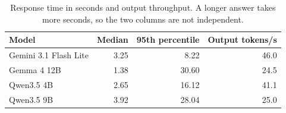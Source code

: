 \begin{table}[htbp]
\centering
\caption{Response time in seconds and output throughput. A longer answer takes more seconds, so the two columns are not independent.}
\label{tab:speed}
{\small
\begin{tabular}{@{}lrrr@{}}
\toprule
Model & Median & 95th percentile & Output tokens/s \\
\midrule
Gemini 3.1 Flash Lite & 3.25 & 8.22 & 46.0 \\
Gemma 4 12B & 1.38 & 30.60 & 24.5 \\
Qwen3.5 4B & 2.65 & 16.12 & 41.1 \\
Qwen3.5 9B & 3.92 & 28.04 & 25.0 \\
\bottomrule
\end{tabular}}
\end{table}
